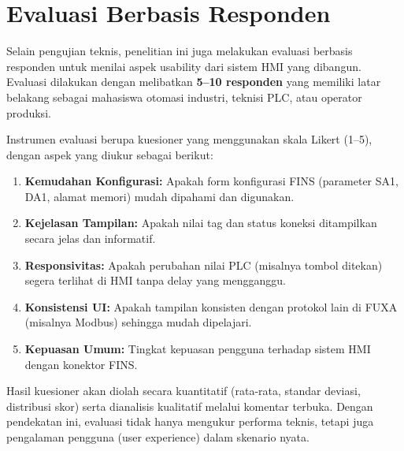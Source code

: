 \section{Evaluasi Berbasis Responden}
Selain pengujian teknis, penelitian ini juga melakukan evaluasi berbasis responden untuk menilai aspek usability dari sistem HMI yang dibangun. 
Evaluasi dilakukan dengan melibatkan \textbf{5--10 responden} yang memiliki latar belakang sebagai mahasiswa otomasi industri, teknisi PLC, atau operator produksi. 

Instrumen evaluasi berupa kuesioner yang menggunakan skala Likert (1--5), dengan aspek yang diukur sebagai berikut:
\begin{enumerate}
    \item \textbf{Kemudahan Konfigurasi:} Apakah form konfigurasi FINS (parameter SA1, DA1, alamat memori) mudah dipahami dan digunakan.
    \item \textbf{Kejelasan Tampilan:} Apakah nilai tag dan status koneksi ditampilkan secara jelas dan informatif.
    \item \textbf{Responsivitas:} Apakah perubahan nilai PLC (misalnya tombol ditekan) segera terlihat di HMI tanpa delay yang mengganggu.
    \item \textbf{Konsistensi UI:} Apakah tampilan konsisten dengan protokol lain di FUXA (misalnya Modbus) sehingga mudah dipelajari.
    \item \textbf{Kepuasan Umum:} Tingkat kepuasan pengguna terhadap sistem HMI dengan konektor FINS.
\end{enumerate}

Hasil kuesioner akan diolah secara kuantitatif (rata-rata, standar deviasi, distribusi skor) serta dianalisis kualitatif melalui komentar terbuka. 
Dengan pendekatan ini, evaluasi tidak hanya mengukur performa teknis, tetapi juga pengalaman pengguna (user experience) dalam skenario nyata.

